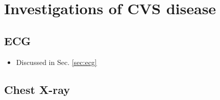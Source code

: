 \documentclass[
  12pt,
]{memoir}
\providecommand{\tightlist}{%
  \setlength{\itemsep}{0pt}\setlength{\parskip}{0pt}}
\begin{document}
\hypertarget{investigations-of-cvs-disease}{%
\section{Investigations of CVS
disease}\label{investigations-of-cvs-disease}}

\hypertarget{ecg}{%
\subsection{ECG}\label{ecg}}

\begin{itemize}
\tightlist
\item
  Discussed in Sec. \ref{sec:ecg}
\end{itemize}

\hypertarget{chest-x-ray}{%
\subsection{Chest X-ray}\label{chest-x-ray}}
\end{document}
